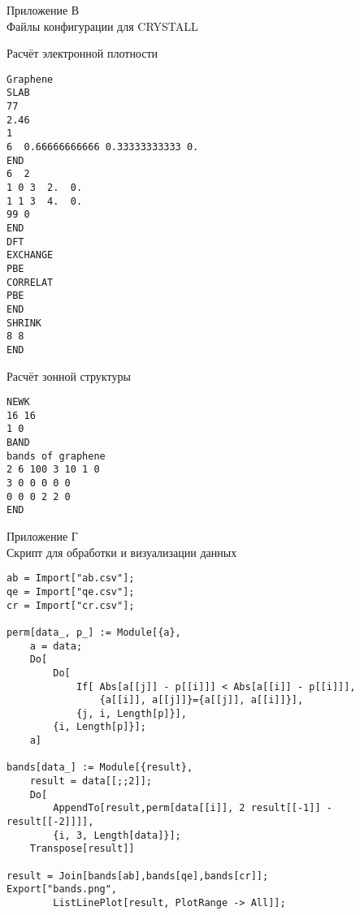 \newpage
\begin{center}
    Приложение В\\
    Файлы конфигурации для CRYSTALL
\end{center}
Расчёт электронной плотности
\begin{Verbatim}[fontsize=\footnotesize]
Graphene
SLAB
77
2.46
1
6  0.66666666666 0.33333333333 0.
END
6  2
1 0 3  2.  0.
1 1 3  4.  0.
99 0
END
DFT
EXCHANGE
PBE
CORRELAT
PBE
END
SHRINK
8 8
END
\end{Verbatim}
\vspace{1cm}
Расчёт зонной структуры
\begin{Verbatim}[fontsize=\footnotesize]
NEWK
16 16
1 0
BAND
bands of graphene
2 6 100 3 10 1 0
3 0 0 0 0 0
0 0 0 2 2 0
END
\end{Verbatim}
\newpage
\begin{center}
    Приложение Г\\
    Скрипт для обработки и визуализации данных
\end{center}
\begin{Verbatim}[fontsize=\footnotesize]
ab = Import["ab.csv"];
qe = Import["qe.csv"];
cr = Import["cr.csv"];

perm[data_, p_] := Module[{a},
    a = data;
    Do[
        Do[
            If[ Abs[a[[j]] - p[[i]]] < Abs[a[[i]] - p[[i]]],
                {a[[i]], a[[j]]}={a[[j]], a[[i]]}],
            {j, i, Length[p]}],
        {i, Length[p]}];
    a]

bands[data_] := Module[{result},
    result = data[[;;2]];
    Do[
        AppendTo[result,perm[data[[i]], 2 result[[-1]] - result[[-2]]]],
        {i, 3, Length[data]}];
    Transpose[result]]

result = Join[bands[ab],bands[qe],bands[cr]];
Export["bands.png",
        ListLinePlot[result, PlotRange -> All]];
\end{Verbatim}